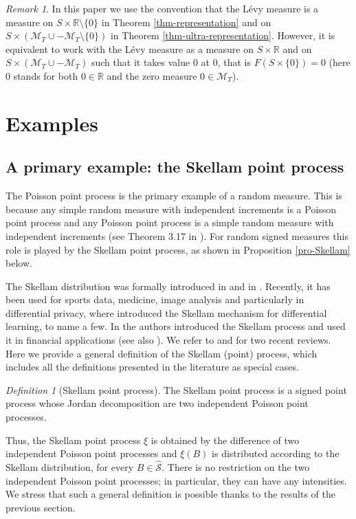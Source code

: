 \documentclass{article}
\theoremstyle{plain}
\theoremstyle{remark}
\newtheorem{remark}[theorem]{Remark}
\newtheorem{definition}[theorem]{Definition}
\begin{document}
\begin{remark}
	In this paper we use the convention that the L\'{e}vy measure is a measure on $S\times\mathbb{R}\setminus\{0\}$ in Theorem \ref{thm-representation} and on $S\times(\mathcal{M}_T\cup-\mathcal{M}_T\setminus\{0\})$ in Theorem \ref{thm-ultra-representation}. However, it is equivalent to work with the L\'{e}vy measure as a measure on $S\times\mathbb{R}$ and on $S\times(\mathcal{M}_T\cup-\mathcal{M}_T)$ such that it takes value $0$ at $0$, that is $F(S\times\{0\})=0$ (here $0$ stands for both $0\in\mathbb{R}$ and the zero measure $0\in\mathcal{M}_T$).
\end{remark}

\section{Examples}\label{Sec-Examples}
\subsection{A primary example: the Skellam point process}
The Poisson point process is the primary example of a random measure. This is because any simple random measure with independent increments is a Poisson point process and any Poisson point process is a  simple random measure with independent increments (see Theorem 3.17 in \citet{Kallenberg2}). For random signed measures this role is played by the Skellam point process, as shown in Proposition \ref{pro-Skellam} below.

The Skellam distribution was formally introduced in \citet{Irwin} and in \citet{Skellam}. Recently, it has been used for sports data, medicine, image analysis and particularly in differential privacy, where \citet{Aga} introduced the Skellam mechanism for differential learning, to name a few. In \citet{Bar} the authors introduced the Skellam process and used it in financial applications (see also \citet{Koopman}). We refer to \citet{Karl3} and \citet{Tomy} for two recent reviews. Here we provide a general definition of the Skellam (point) process, which includes all the definitions presented in the literature as special cases.
\begin{definition}
	[Skellam point process] The Skellam point process is a signed point process whose Jordan decomposition are two independent Poisson point processes.
\end{definition}
\noindent Thus, the Skellam point process $\xi$ is obtained by the difference of two independent Poisson point processes and $\xi(B)$ is distributed according to the Skellam distribution, for every $B\in\hat{\mathcal{S}}$.  There is no restriction on the two independent Poisson point processes; in particular, they can have any intensities. We stress that such a general definition is possible thanks to the results of the previous section. 
\end{document}

